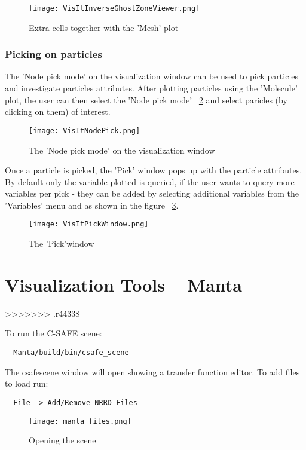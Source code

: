\begin{figure}
  \center
  \texttt{[image: VisItInverseGhostZoneViewer.png]}
  \caption{Extra cells together with the 'Mesh' plot}
  \label{VisItInverseGhostZoneViewer}
\end{figure}

\subsection{Picking on particles}

The 'Node pick mode' on the visualization window can be used to pick particles and investigate particles attributes. After plotting particles using the 'Molecule' plot, the user can then select the 'Node pick mode' ~\ref{VisItNodePick} and select paricles (by clicking on them) of interest. 

\begin{figure}
  \center
  \texttt{[image: VisItNodePick.png]}
  \caption{The 'Node pick mode' on the visualization window}
  \label{VisItNodePick}
\end{figure}

Once a particle is picked, the 'Pick' window pops up with the particle attributes. By default only the variable plotted is queried, if the user wants to query more variables per pick - they can be added by selecting additional variables from the 'Variables' menu and as shown in the figure ~\ref{VisItPickWindow}.

\begin{figure}
  \center
  \texttt{[image: VisItPickWindow.png]}
  \caption{The 'Pick'window }
  \label{VisItPickWindow}
\end{figure}

\chapter{Visualization Tools -- Manta}
>>>>>>> .r44338

To run the C-SAFE scene: 
\begin{Verbatim}
  Manta/build/bin/csafe_scene
\end{Verbatim}

The csafescene window will open showing a transfer function editor.  To add files to load run:
\begin{Verbatim}
  File -> Add/Remove NRRD Files
\end{Verbatim}

\begin{figure}[htbp]
  \center
  \texttt{[image: manta\_files.png]}
  \caption{Opening the scene}
  \label{fig:manta_files}
\end{figure}

